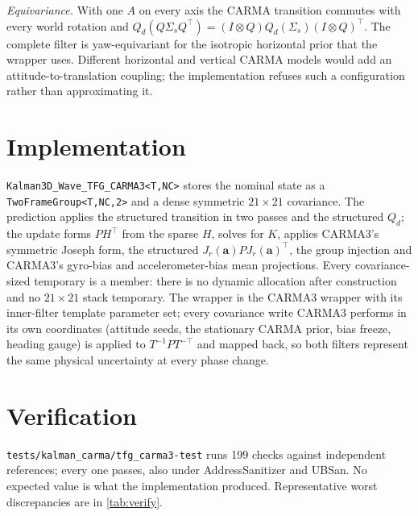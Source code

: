 \documentclass[conference]{IEEEtran}
\theoremstyle{bodysmall}
\begin{document}
\emph{Equivariance.} With one $A$ on every axis the CARMA transition commutes
with every world rotation and
$Q_d(Q\Sigma_sQ^{\top})=(I\otimes Q)Q_d(\Sigma_s)(I\otimes Q)^{\top}$. The
complete filter is yaw-equivariant for the isotropic horizontal prior that the
wrapper uses. Different horizontal and vertical CARMA models would add an
attitude-to-translation coupling; the implementation refuses such a
configuration rather than approximating it.

\section{Implementation}
\label{sec:impl}
\texttt{Kalman3D\_Wave\_TFG\_CARMA3<T,NC>} stores the nominal state as a
\texttt{TwoFrameGroup<T,NC,2>} and a dense symmetric $21\times21$ covariance.
The prediction applies the structured transition in two passes and the
structured $Q_d$; the update forms $PH^{\top}$ from the sparse $H$, solves for
$K$, applies CARMA3's symmetric Joseph form, the structured
$J_r(\mathbf a)PJ_r(\mathbf a)^{\top}$, the group injection and CARMA3's
gyro-bias and accelerometer-bias mean projections. Every covariance-sized
temporary is a member: there is no dynamic allocation after construction and
no $21\times21$ stack temporary. The wrapper is the CARMA3 wrapper with its
inner-filter template parameter set; every covariance write CARMA3 performs in
its own coordinates (attitude seeds, the stationary CARMA prior, bias freeze,
heading gauge) is applied to $T^{-1}PT^{-\top}$ and mapped back, so both
filters represent the same physical uncertainty at every phase change.

\section{Verification}
\label{sec:verify}
\texttt{tests/kalman\_carma/tfg\_carma3-test} runs 199 checks against
independent references; every one passes, also under AddressSanitizer and
UBSan. No expected value is what the implementation produced. Representative
worst discrepancies are in \cref{tab:verify}.
\end{document}
